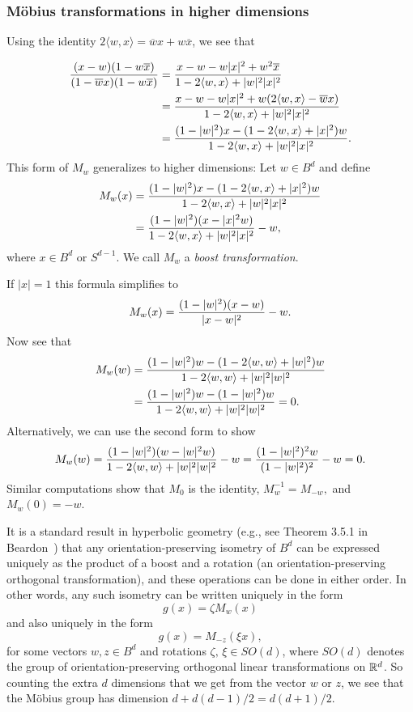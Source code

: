 \documentclass[%
 aip,
 amsmath,amssymb,
 reprint,%
]{revtex4-1}
\begin{document}
\subsubsection{M\"obius transformations in higher dimensions}

Using the identity $2 \langle w, x \rangle = \overline w x + w \overline x$, we see that

\begin{align*}
{(x-w)  (1 - w \overline x) \over (1-\overline w x)(1 - w \overline x)} &= {x-w -w |x|^2 +w^2 \overline x\over 1 -2 \langle w, x \rangle +|w|^2|x|^2} \\ &= {x-w -w |x|^2 +w( 2 \langle w, x\rangle - \overline w x) \over 1 -2 \langle w, x \rangle +|w|^2|x|^2} \cr &= {(1-|w|^2) x-(1  - 2 \langle w, x \rangle +|x|^2) w \over 1 - 2\langle w, x\rangle + |w|^2 |x|^2}. 
\end{align*}
This form of $M_w$ generalizes to higher dimensions:  Let $w \in B^d$ and define
\begin{align*}
M_w(x) &=  {(1-|w|^2) x-(1  - 2 \langle w, x \rangle +|x|^2) w \over 1 - 2\langle w, x\rangle + |w|^2 |x|^2}  \\ &= {(1-|w|^2) (x-|x|^2 w)\over 1 - 2\langle w, x\rangle + |w|^2 |x|^2} -w,
\end{align*}
where $x \in B^d$ or $S^{d-1}$.  We call $M_w$ a \emph{boost transformation}.  

If $|x| = 1$ this formula simplifies to
$$
M_w(x) = {(1-|w|^2) (x-w) \over |x-w|^2 } -w.
$$
Now see that
\begin{align*}
M_w(w) &=  {(1-|w|^2) w-(1  - 2 \langle w, w \rangle +|w|^2) w \over 1 - 2\langle w, w\rangle + |w|^2 |w|^2} \\ &= {(1-|w|^2) w-(1  - |w|^2) w \over 1 - 2\langle w, w\rangle + |w|^2 |w|^2} = 0.
\end{align*}
Alternatively, we can use the second form to show
$$
M_w(w)    = {(1-|w|^2) (w-|w|^2 w)\over 1 - 2\langle w, w\rangle + |w|^2 |w|^2} -w = { (1-|w|^2)^2 w \over (1-|w|^2)^2 } - w = 0.
$$ 
Similar computations show that $M_0$ is the identity, $M_w^{-1} = M_{-w},$ and $M_w(0) = -w$. 

It is a standard result in hyperbolic geometry (e.g., see Theorem 3.5.1 in Beardon~\cite{ab83}) that any orientation-preserving isometry of $B^d$ can be expressed uniquely as the product of a boost and a rotation (an orientation-preserving orthogonal transformation), and these operations can be done in either order. In other words, any such  isometry can be written uniquely in the form
$$
g(x) = \zeta M_w(x)
$$
and also uniquely in the form
$$
g(x) = M_{-z} (\xi x),
$$
for some vectors $w, z \in B^d$ and rotations $\zeta, \, \xi \in SO(d)$,  where $SO(d)$ denotes the group of orientation-preserving orthogonal linear transformations on ${\Bbb R}^d$. So counting the extra $d$ dimensions that we get from the vector $w$ or $z$,  we see that the Möbius group has dimension $d + d(d-1)/2 = d(d+1)/2$.
\end{document}
